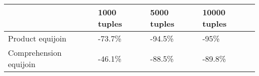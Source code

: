 \begin{tabular}{llll}
\toprule
 & 1000 tuples & 5000 tuples & 10000 tuples \\
\midrule
Product equijoin & -73.7\% & -94.5\% & -95\% \\
Comprehension equijoin & -46.1\% & -88.5\% & -89.8\% \\
\bottomrule
\end{tabular}
